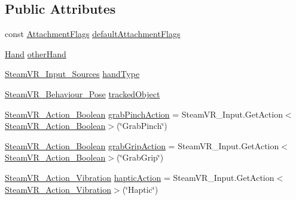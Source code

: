 \subsection*{Public Attributes}
\begin{DoxyCompactItemize}
\item 
const \mbox{\hyperlink{class_valve_1_1_v_r_1_1_interaction_system_1_1_hand_a61701f82b8f3fac8818954ec71804cb5}{Attachment\+Flags}} \mbox{\hyperlink{class_valve_1_1_v_r_1_1_interaction_system_1_1_hand_a836a6cb55d2514dbed680981dfcc5505}{default\+Attachment\+Flags}}
\item 
\mbox{\hyperlink{class_valve_1_1_v_r_1_1_interaction_system_1_1_hand}{Hand}} \mbox{\hyperlink{class_valve_1_1_v_r_1_1_interaction_system_1_1_hand_af5e110dcf7ecc1498c8e8e1425636f81}{other\+Hand}}
\item 
\mbox{\hyperlink{namespace_valve_1_1_v_r_a82e5bf501cc3aa155444ee3f0662853f}{Steam\+V\+R\+\_\+\+Input\+\_\+\+Sources}} \mbox{\hyperlink{class_valve_1_1_v_r_1_1_interaction_system_1_1_hand_a05520135148fd74ca10b8549d5c7354d}{hand\+Type}}
\item 
\mbox{\hyperlink{class_valve_1_1_v_r_1_1_steam_v_r___behaviour___pose}{Steam\+V\+R\+\_\+\+Behaviour\+\_\+\+Pose}} \mbox{\hyperlink{class_valve_1_1_v_r_1_1_interaction_system_1_1_hand_a43cfd26470a73ef7eb6e3b5528816b18}{tracked\+Object}}
\item 
\mbox{\hyperlink{class_valve_1_1_v_r_1_1_steam_v_r___action___boolean}{Steam\+V\+R\+\_\+\+Action\+\_\+\+Boolean}} \mbox{\hyperlink{class_valve_1_1_v_r_1_1_interaction_system_1_1_hand_a5edbb151faace00054d6c6bff461c131}{grab\+Pinch\+Action}} = Steam\+V\+R\+\_\+\+Input.\+Get\+Action$<$\mbox{\hyperlink{class_valve_1_1_v_r_1_1_steam_v_r___action___boolean}{Steam\+V\+R\+\_\+\+Action\+\_\+\+Boolean}}$>$(\char`\"{}Grab\+Pinch\char`\"{})
\item 
\mbox{\hyperlink{class_valve_1_1_v_r_1_1_steam_v_r___action___boolean}{Steam\+V\+R\+\_\+\+Action\+\_\+\+Boolean}} \mbox{\hyperlink{class_valve_1_1_v_r_1_1_interaction_system_1_1_hand_a814c456c88eddca79adeaada444bd3fa}{grab\+Grip\+Action}} = Steam\+V\+R\+\_\+\+Input.\+Get\+Action$<$\mbox{\hyperlink{class_valve_1_1_v_r_1_1_steam_v_r___action___boolean}{Steam\+V\+R\+\_\+\+Action\+\_\+\+Boolean}}$>$(\char`\"{}Grab\+Grip\char`\"{})
\item 
\mbox{\hyperlink{class_valve_1_1_v_r_1_1_steam_v_r___action___vibration}{Steam\+V\+R\+\_\+\+Action\+\_\+\+Vibration}} \mbox{\hyperlink{class_valve_1_1_v_r_1_1_interaction_system_1_1_hand_aa595f318a8edefcde45c293260a913a8}{haptic\+Action}} = Steam\+V\+R\+\_\+\+Input.\+Get\+Action$<$\mbox{\hyperlink{class_valve_1_1_v_r_1_1_steam_v_r___action___vibration}{Steam\+V\+R\+\_\+\+Action\+\_\+\+Vibration}}$>$(\char`\"{}Haptic\char`\"{})

\end{DoxyCompactItemize}
